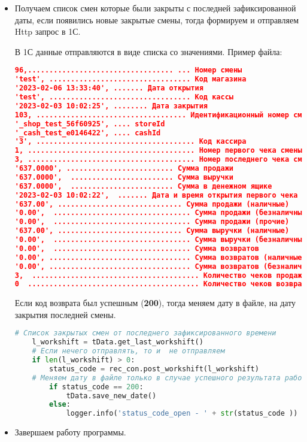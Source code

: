 \begin{itemize}
\item Получаем список смен которые были закрыты с последней зафиксированной даты, если появились новые закрытые смены, тогда формируем и отправляем Http запрос в 1С. 


В 1С данные отправляются в виде списка со значениями. Пример файла:

\begin{lstlisting}[language=json,firstnumber=1, caption= Формат файла закрытых смен]
96,.................................. ... Номер смены
'test', ................................. Код магазина
'2023-02-06 13:33:40', ....... Дата открытия 
'test', ................................. Код кассы
'2023-02-03 10:02:25', ........ Дата закрытия
103, ................................... Идентификационный номер смены
'_shop_test_56f60925', .... storeId
'_cash_test_e0146422', .... cashId
'3', ..................................... Код кассира
1, ....................................... Номер первого чека смены
3, ....................................... Номер последнего чека смены
'637.0000', ......................... Сумма продажи
'637.0000',  ........................ Сумма выручки
'637.0000',  ........................ Сумма в денежном ящике
'2023-02-03 10:02:22',  ....... Дата и время открытия первого чека в смене
'637.00', ............................. Сумма продажи (наличные)
'0.00',  ................................ Сумма продажи (безналичные)
'0.00',  ................................ Сумма продажи (прочие)
'637.00', ............................. Сумма выручки (наличные)
'0.00',  ................................ Сумма выручки (безналичные)
'0.00',  ................................ Сумма возвратов
'0.00', ................................. Сумма возвратов (наличные)
'0.00', ................................. Сумма возвратов (безналичные)
3,  ....................................... Количество чеков продажи
0  ........................................ Количество чеков возврата
\end{lstlisting}



Если код возврата был успешным (\textbf{200}), тогда меняем дату в файле, на дату закрытия последней смены.
\newline
	\begin{lstlisting}[language=Python, caption=Закрытые смены]
	# Список закрытых смен от последнего зафиксированного времени
	l_workshift = tData.get_last_workshift()
	# Если нечего отправлять, то и  не отправляем
	if len(l_workshift) > 0:
		status_code = rec_con.post_workshift(l_workshift)
	# Меняем дату в файле только в случае успешного результата работы 1C
		if status_code == 200:
			tData.save_new_date()
		else:
			logger.info('status_code_open - ' + str(status_code ))
	\end{lstlisting}


\item Завершаем работу программы.




\end{itemize}

\newpage
